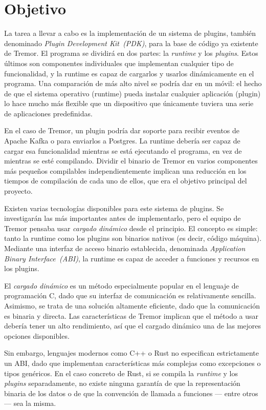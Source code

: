 \section{Objetivo}

La tarea a llevar a cabo es la implementación de un sistema de plugins, también
denominado \emph{Plugin Development Kit~(PDK)}, para la base de código ya
existente de Tremor. El programa se dividirá en dos partes: la \emph{runtime} y
los \emph{plugins}. Estos últimos son componentes individuales que implementan
cualquier tipo de funcionalidad, y la runtime es capaz de cargarlos y usarlos
dinámicamente en el programa. Una comparación de más alto nivel se podría dar en
un móvil: el hecho de que el sistema operativo (runtime) pueda instalar
cualquier aplicación (plugin) lo hace mucho más flexible que un dispositivo que
únicamente tuviera una serie de aplicaciones predefinidas.

En el caso de Tremor, un plugin podría dar soporte para recibir eventos de
Apache Kafka o para enviarlos a Postgres. La runtime debería ser capaz de cargar
esa funcionalidad mientras se está ejecutando el programa, en vez de mientras se
esté compilando. Dividir el binario de Tremor en varios componentes más pequeños
compilables independientemente implican una reducción en los tiempos de
compilación de cada uno de ellos, que era el objetivo principal del proyecto.

Existen varias tecnologías disponibles para este sistema de plugins. Se
investigarán las más importantes antes de implementarlo, pero el equipo de
Tremor pensaba usar \emph{cargado dinámico} desde el principio. El concepto es
simple: tanto la runtime como los plugins son binarios nativos (es decir, código
máquina). Mediante una interfaz de acceso binario establecida, denominada
\emph{Application Binary Interface~(ABI)}, la runtime es capaz de acceder a
funciones y recursos en los plugins.

El \emph{cargado dinámico} es un método especialmente popular en el lenguaje de
programación C, dado que su interfaz de comunicación es relativamente sencilla.
Asimismo, se trata de una solución altamente eficiente, dado que la comunicación
es binaria y directa. Las características de Tremor implican que el método a
usar debería tener un alto rendimiento, así que el cargado dinámico una de las
mejores opciones disponibles.

Sin embargo, lenguajes modernos como C++ o Rust no especifican estrictamente un
ABI, dado que implementan características más complejas como excepciones o tipos
genéricos. En el caso concreto de Rust, si se compila la \emph{runtime} y los
\emph{plugins} separadamente, no existe ninguna garantía de que la
representación binaria de los datos o de que la convención de llamada a
funciones --- entre otros --- sea la misma.

